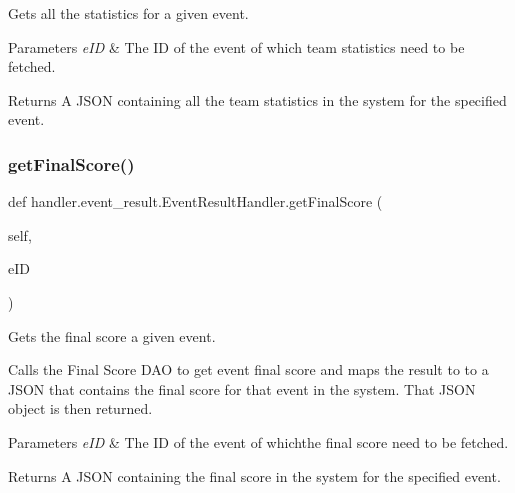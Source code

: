 Gets all the statistics for a given event. 


\begin{DoxyParams}{Parameters}
{\em e\+ID} & The ID of the event of which team statistics need to be fetched.\\
\hline
\end{DoxyParams}
\begin{DoxyReturn}{Returns}
A J\+S\+ON containing all the team statistics in the system for the specified event. 
\end{DoxyReturn}
\mbox{\label{classhandler_1_1event__result_1_1_event_result_handler_a32a3de5debe160b627747ea12989f32c}} 
\subsubsection{\texorpdfstring{get\+Final\+Score()}{getFinalScore()}}
{\footnotesize\ttfamily def handler.\+event\+\_\+result.\+Event\+Result\+Handler.\+get\+Final\+Score (\begin{DoxyParamCaption}\item[{}]{self,  }\item[{}]{e\+ID }\end{DoxyParamCaption})}



Gets the final score a given event. 

Calls the Final Score D\+AO to get event final score and maps the result to to a J\+S\+ON that contains the final score for that event in the system. That J\+S\+ON object is then returned.


\begin{DoxyParams}{Parameters}
{\em e\+ID} & The ID of the event of whichthe final score need to be fetched.\\
\hline
\end{DoxyParams}
\begin{DoxyReturn}{Returns}
A J\+S\+ON containing the final score in the system for the specified event. 
\end{DoxyReturn}
\mbox{\label{classhandler_1_1event__result_1_1_event_result_handler_afda5b5b489168c47bad1456bfdbf536c}} 
